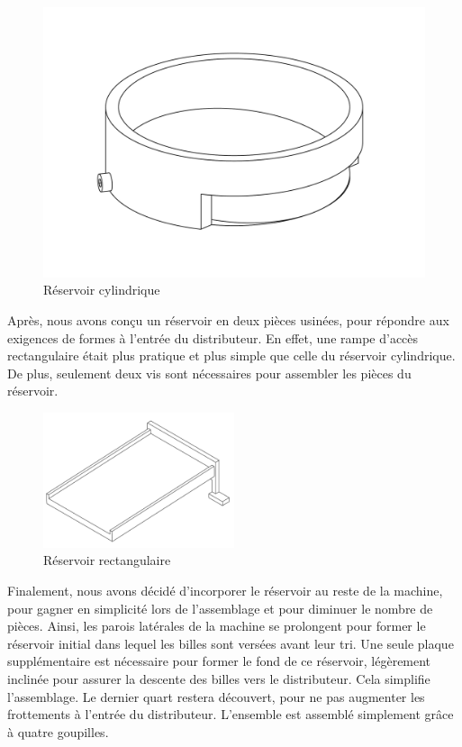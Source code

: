 \begin{figure}
    \centering
    \includegraphics[width=\textwidth]{Graphics/Reservoir_initial/RESERVOIR_CYLINDRIQUE.pdf}
    \caption{Réservoir cylindrique}
\end{figure}

Après, nous avons conçu un réservoir en deux pièces usinées, pour répondre aux exigences de formes à l'entrée du distributeur. En effet, une rampe d'accès rectangulaire était plus pratique et plus simple que celle du réservoir cylindrique. De plus, seulement deux vis sont nécessaires pour assembler les pièces du réservoir. 
\begin{figure}
    \centering
    \includegraphics[width=0.5\textwidth]{Graphics/Reservoir_initial/RESERVOIR_CUBE.pdf}
    \caption{Réservoir rectangulaire}
\end{figure}

Finalement, nous avons décidé d'incorporer le réservoir au reste de la machine, pour gagner en simplicité lors de l'assemblage et pour diminuer le nombre de pièces. Ainsi, les parois latérales de la machine se prolongent pour former le réservoir initial dans lequel les billes sont versées avant leur tri. Une seule plaque supplémentaire est nécessaire pour former le fond de ce réservoir, légèrement inclinée pour assurer la descente des billes vers le distributeur. Cela simplifie l'assemblage.  Le dernier quart restera découvert, pour ne pas augmenter les frottements à l'entrée du distributeur. L'ensemble est assemblé simplement grâce à quatre goupilles. 


